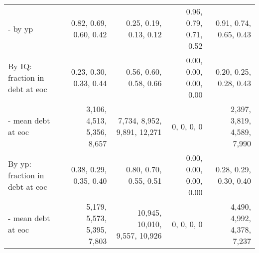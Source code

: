 \begin{tabular}{lrrrr}
- by yp & 0.82, 0.69, 0.60, 0.42  & 0.25, 0.19, 0.13, 0.12  & 0.96, 0.79, 0.71, 0.52  & 0.91, 0.74, 0.65, 0.43  \\
By IQ: fraction in debt at eoc & 0.23, 0.30, 0.33, 0.44  & 0.56, 0.60, 0.58, 0.66  & 0.00, 0.00, 0.00, 0.00  & 0.20, 0.25, 0.28, 0.43  \\
- mean debt at eoc & 3,106, 4,513, 5,356, 8,657  & 7,734, 8,952, 9,891, 12,271  & 0, 0, 0, 0  & 2,397, 3,819, 4,589, 7,990  \\
By yp: fraction in debt at eoc & 0.38, 0.29, 0.35, 0.40  & 0.80, 0.70, 0.55, 0.51  & 0.00, 0.00, 0.00, 0.00  & 0.28, 0.29, 0.30, 0.40  \\
- mean debt at eoc & 5,179, 5,573, 5,395, 7,803  & 10,945, 10,010, 9,557, 10,926  & 0, 0, 0, 0  & 4,490, 4,992, 4,378, 7,237  \\
\hline
\end{tabular}%
